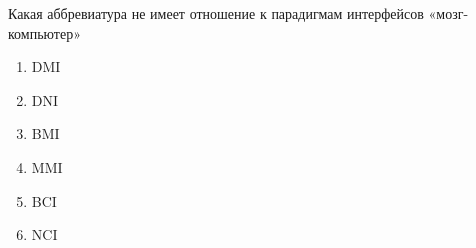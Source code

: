 
Какая аббревиатура не имеет отношение к парадигмам интерфейсов «мозг-компьютер»

\begin{enumerate}
    \item DMI
    \item DNI
    \item BMI
    \item MMI
    \item BCI
    \item NCI
\end{enumerate}